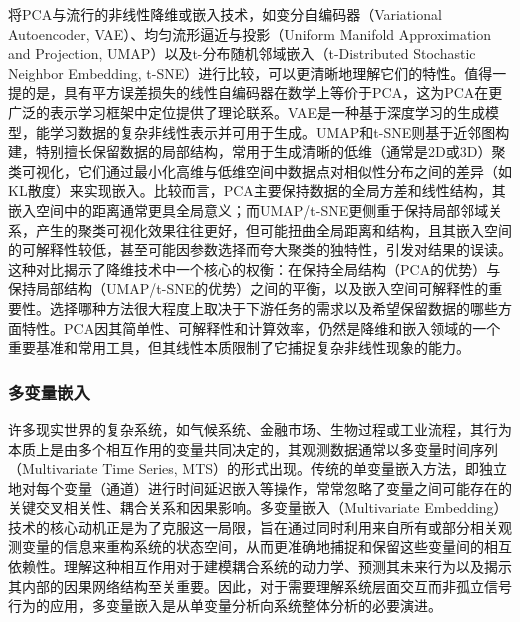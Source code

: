 将PCA与流行的非线性降维或嵌入技术，如变分自编码器（Variational Autoencoder, VAE）、均匀流形逼近与投影（Uniform Manifold Approximation and Projection, UMAP）以及t-分布随机邻域嵌入（t-Distributed Stochastic Neighbor Embedding, t-SNE）进行比较，可以更清晰地理解它们的特性。值得一提的是，具有平方误差损失的线性自编码器在数学上等价于PCA，这为PCA在更广泛的表示学习框架中定位提供了理论联系。VAE是一种基于深度学习的生成模型，能学习数据的复杂非线性表示并可用于生成。UMAP和t-SNE则基于近邻图构建，特别擅长保留数据的局部结构，常用于生成清晰的低维（通常是2D或3D）聚类可视化，它们通过最小化高维与低维空间中数据点对相似性分布之间的差异（如KL散度）来实现嵌入。比较而言，PCA主要保持数据的全局方差和线性结构，其嵌入空间中的距离通常更具全局意义；而UMAP/t-SNE更侧重于保持局部邻域关系，产生的聚类可视化效果往往更好，但可能扭曲全局距离和结构，且其嵌入空间的可解释性较低，甚至可能因参数选择而夸大聚类的独特性，引发对结果的误读。这种对比揭示了降维技术中一个核心的权衡：在保持全局结构（PCA的优势）与保持局部结构（UMAP/t-SNE的优势）之间的平衡，以及嵌入空间可解释性的重要性。选择哪种方法很大程度上取决于下游任务的需求以及希望保留数据的哪些方面特性。PCA因其简单性、可解释性和计算效率，仍然是降维和嵌入领域的一个重要基准和常用工具，但其线性本质限制了它捕捉复杂非线性现象的能力。

\subsubsection{多变量嵌入}
许多现实世界的复杂系统，如气候系统、金融市场、生物过程或工业流程，其行为本质上是由多个相互作用的变量共同决定的，其观测数据通常以多变量时间序列（Multivariate Time Series, MTS）的形式出现。传统的单变量嵌入方法，即独立地对每个变量（通道）进行时间延迟嵌入等操作，常常忽略了变量之间可能存在的关键交叉相关性、耦合关系和因果影响。多变量嵌入（Multivariate Embedding）技术的核心动机正是为了克服这一局限，旨在通过同时利用来自所有或部分相关观测变量的信息来重构系统的状态空间，从而更准确地捕捉和保留这些变量间的相互依赖性。理解这种相互作用对于建模耦合系统的动力学、预测其未来行为以及揭示其内部的因果网络结构至关重要。因此，对于需要理解系统层面交互而非孤立信号行为的应用，多变量嵌入是从单变量分析向系统整体分析的必要演进。

